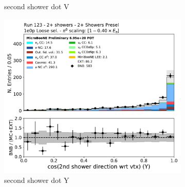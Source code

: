 \begin{figure}[H]
\begin{subfigure}{0.3\textwidth}
    \caption{second shower dot V}
    \end{subfigure}
    \begin{subfigure}{0.3\textwidth}
    \includegraphics[width=1.0\textwidth]{Sidebands/Figures/TwoShr_1e0pSel/loose/secondshower_Y_dot.pdf}
    \caption{second shower dot Y}
    \end{subfigure}
    \caption{} 
    \label{fig:HE_1eNp_1}
\end{figure}

